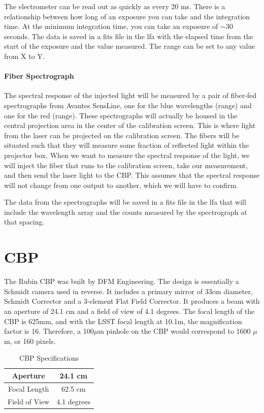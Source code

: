\documentclass[SE,authoryear,lsstdraft,toc]{lsstdoc}
\begin{document}
The electrometer can be read out as quickly as every 20 ms. There is a relationship between how long of an exposure you can take and the integration time. At the minimum integration time, you can take an exposure of $\sim$30 seconds. The data is saved in a fits file in the lfa with the elapsed time from the start of the exposure and the value measured. The range can be set to any value from X to Y. 

\paragraph{\textbf{Fiber Spectrograph}}

The spectral response of the injected light will be measured by a pair of fiber-fed spectrographs from Avantes SensLine, one for the blue wavelengths (range) and one for the red (range). These spectrographs will actually be housed in the central projection area in the center of the calibration screen. This is where light from the laser can be projected on the calibration screen. The fibers will be situated such that they will measure some fraction of reflected light within the projector box. When we want to measure the spectral response of the light, we will inject the fiber that runs to the calibration screen, take our measurement, and then send the laser light to the CBP. This assumes that the spectral response will not change from one output to another, which we will have to confirm.

The data from the spectrographs will be saved in a fits file in the lfa that will include the wavelength array and the counts measured by the spectrograph at that spacing.

\section{CBP}
The Rubin CBP was built by DFM Engineering. 
The design is essentially a Schmidt camera used in reverse. 
It includes a primary mirror of 33cm diameter, Schmidt Corrector and a 3-element Flat Field Corrector. 
It produces a beam with an aperture of 24.1 cm and a field of view of 4.1 degrees. 
The focal length of the CBP is 625mm, and with the LSST focal length at 10.1m, the magnification factor is 16. Therefore, a 100$\mu$m pinhole on the CBP would correspond to 1600 $\mu$m, or 160 pixels. 

\begin{table}[h!]
    \centering
    \begin{tabular}{|c|c|}
      \hline
       Aperture   & 24.1 cm \\
      \hline
      Focal Length   & 62.5 cm \\
      \hline
      Field of View & 4.1 degrees \\
      \hline
    \end{tabular}
    \caption{CBP Specifications}
    \label{tab:my_label}
\end{table}
\end{document}
